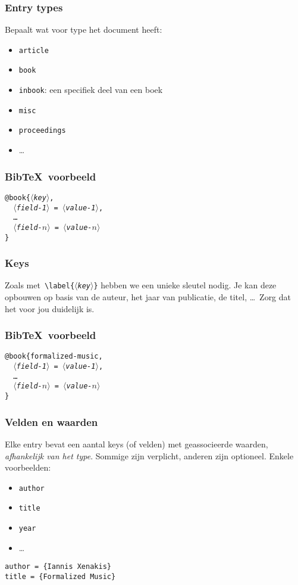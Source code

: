 \begin{frame}
  \frametitle{Entry types}

  Bepaalt wat voor type het document heeft:
  \begin{itemize}
	\item \texttt{article}
	\item \texttt{book}
	\item \texttt{inbook}: een specifiek deel van een boek
	\item \texttt{misc}
	\item \texttt{proceedings}
	\item \ldots
  \end{itemize}
\end{frame}

\begin{frame}
  \frametitle{Bib\TeX\ voorbeeld}

\texttt{@book\{\textsl{$\langle$key$\rangle$},\\
\ \ \textsl{$\langle$field-1$\rangle$} = \textsl{$\langle$value-1$\rangle$}, \\
\ \ \ldots \\
\ \ \textsl{$\langle$field-$n\rangle$} = \textsl{$\langle$value-$n\rangle$} \\
\}}
\end{frame}

\begin{frame}
  \frametitle{Keys}

  Zoals met~\texttt{\textcolor{uagreen}{\textbackslash label}\{\textsl{$\langle$key$\rangle$}\}} hebben we een unieke sleutel nodig. Je kan deze opbouwen op basis van de auteur, het jaar van publicatie, de titel, \ldots\ Zorg dat het voor jou duidelijk is.
\end{frame}

\begin{frame}
  \frametitle{Bib\TeX\ voorbeeld}

\texttt{{@}book\{formalized-music,\\
\ \ \textsl{$\langle$field-1$\rangle$} = \textsl{$\langle$value-1$\rangle$}, \\
\ \ \ldots \\
\ \ \textsl{$\langle$field-$n\rangle$} = \textsl{$\langle$value-$n\rangle$} \\
\}}
\end{frame}

\begin{frame}[fragile]
  \frametitle{Velden en waarden}

  Elke entry bevat een aantal keys (of velden) met geassocieerde waarden, \emph{afhankelijk van het type}. Sommige zijn verplicht, anderen zijn optioneel. Enkele voorbeelden:
  \begin{itemize}
	\item \texttt{author}
	\item \texttt{title}
	\item \texttt{year}
	\item \ldots
  \end{itemize}
  \verb|author = {Iannis Xenakis}| \\
  \verb|title = {Formalized Music}|
\end{frame}

